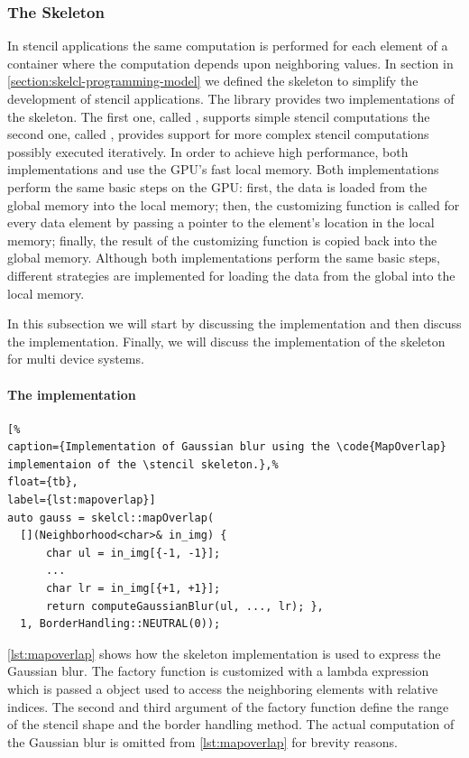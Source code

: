 \subsubsection{The \stencil Skeleton}
In stencil applications the same computation is performed for each element of a container where the computation depends upon neighboring values.
In section in \autoref{section:skelcl-programming-model} we defined the \stencil skeleton to simplify the development of stencil applications.
The \SkelCL library provides two implementations of the \stencil skeleton.
The first one, called , supports simple stencil computations the second one, called , provides support for more complex stencil computations possibly executed iteratively.
In order to achieve high performance, both implementations  and  use the GPU's fast local memory.
Both implementations perform the same basic steps on the GPU:
first, the data is loaded from the global memory into the local memory;
then, the customizing function is called for every data element by passing a pointer to the element's location in the local memory;
finally, the result of the customizing function is copied back into the global memory.
Although both implementations perform the same basic steps, different strategies are implemented for loading the data from the global into the local memory.

In this subsection we will start by discussing the  implementation and then discuss the  implementation.
Finally, we will discuss the implementation of the \stencil skeleton for multi device systems.

\paragraph{The  implementation}

\begin{lstlisting}[%
caption={Implementation of Gaussian blur using the \code{MapOverlap} implementaion of the \stencil skeleton.},%
float={tb},
label={lst:mapoverlap}]
auto gauss = skelcl::mapOverlap(
  [](Neighborhood<char>& in_img) {
      char ul = in_img[{-1, -1}];
      ...
      char lr = in_img[{+1, +1}];
      return computeGaussianBlur(ul, ..., lr); },
  1, BorderHandling::NEUTRAL(0));
\end{lstlisting}

\autoref{lst:mapoverlap} shows how the  skeleton implementation is used to express the Gaussian blur.
The  factory function is customized with a lambda expression which is passed a  object used to access the neighboring elements with relative indices.
The second and third argument of the factory function define the range of the stencil shape and the border handling method.
The actual computation of the Gaussian blur is omitted from \autoref{lst:mapoverlap} for brevity reasons.

